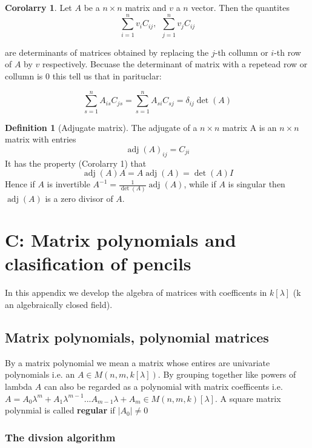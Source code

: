 \documentclass{tufte-book} %
\theoremstyle{definition}
\newtheorem{definition}{Definition}
\theoremstyle{theorem}
\theoremstyle{proposition}
\theoremstyle{lemma}
\theoremstyle{corolarry}
\newtheorem{corolarry}{Corolarry}
\DeclareMathOperator{\adj}{adj}
\begin{document}
\begin{corolarry}
  Let $A$ be a $n \times n$ matrix and $v$ a $n$ vector. Then the quantites 
  $$ \displaystyle\sum_{i=1}^{n} v_i C_{ij},~~ \displaystyle\sum_{j=1}^{n} v_j C_{ij} $$

  are determinants of matrices obtained by replacing the $j$-th collumn or $i$-th row of $A$ by $v$ respectively.
  Becuase the determinant of matrix with a repetead row or collumn is $0$ this tell us that in parituclar:

  $$ \displaystyle\sum_{s=1}^{n} A_{is}C_{js} = \displaystyle\sum_{s=1}^{n} A_{si}C_{sj} =  \delta_{ij} \det(A)$$

  
\end{corolarry}

\begin{definition}[Adjugate matrix]
  The adjugate of a $n \times n$ matrix A is an $n \times n$ matrix with entries $$\adj(A)_{ij} = C_{ji}$$
  It has the property (Corolarry 1) that $$ \adj(A)A = A\adj(A) = \det(A)I$$
  Hence if $A$ is invertible $A^{-1} = \frac{1}{\det(A)}\adj(A)$, while if $A$ is singular then $\adj(A)$ is a zero divisor of $A$.
  
\end{definition}

\chapter{C: Matrix polynomials and clasification of pencils}

In this appendix we develop the algebra of matrices with coefficents in $k[\lambda]$ (k an algebraically closed field).

\section{Matrix polynomials, polynomial matrices}

  By a matrix polynomial we mean a matrix whose entires are univariate polynomials i.e. an $A \in M(n,m,k[\lambda])$.
  By grouping together like powers of lambda $A$ can also be regarded as a polynomial with matrix coefficents i.e. $A = A_0 \lambda^m + A_1 \lambda^{m-1}... A_{m-1}\lambda + A_m \in M(n,m,k)[\lambda]$. A square matrix polynmial is called \textbf{regular} if $|A_0| \neq 0$

  \subsection{The divsion algorithm}
\end{document}
